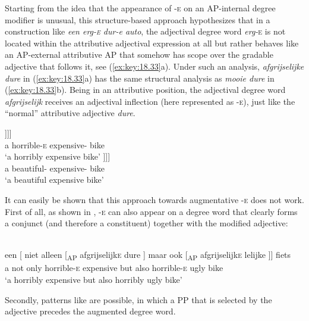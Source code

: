 \documentclass[output=paper]{langsci/langscibook}
\begin{document}
Starting from the idea that the appearance of \textsc{-e} on an AP-internal
degree modifier is unusual, this structure-based approach hypothesizes that in
a construction like \emph{een erg-\textsc{e} dur-e auto}, the adjectival degree
word \emph{erg-}\textsc{e} is not located within the attributive adjectival
expression at all but rather behaves like an AP-external attributive AP that
somehow has scope over the gradable adjective that follows it, see
(\ref{ex:key:18.33}a). Under such an analysis, \emph{afgrijselijke dure} in
(\ref{ex:key:18.33}a) has the same structural analysis as \emph{mooie dure} in
(\ref{ex:key:18.33}b). Being in an attributive position, the adjectival degree word
\emph{afgrijselijk} receives an adjectival inflection (here represented as
\textsc{-e}), just like the \enquote{normal} attributive adjective \emph{dure}.

\ea%
    \label{ex:key:18.33}
	\ea
	\gll  [\textsubscript{DP} een    [\textsubscript{NP}  afgrijselijk\textsc{-e}    [\textsubscript{NP}  dure              [\textsubscript{NP} fiets ]]]]\\
		{} a  {}                  horrible-\textsc{e}    {}        expensive-\Agr{}  {}    bike\\
	\glt \enquote*{a horribly expensive bike}
	\ex
	\gll  [\textsubscript{DP}  een    [\textsubscript{NP}  mooie        [\textsubscript{NP}  dure                [\textsubscript{NP}  fiets ]]]]\\
		{} a  {}     beautiful-\Agr{}  {}    expensive-\Agr{} {}   bike\\
	\glt \enquote*{a beautiful expensive bike}
	\z
\z

It can easily be shown that this approach towards augmentative \textsc{-e} does
not work. First of all, as shown in , \textsc{-e} can also
appear on a degree word that clearly forms a conjunct (and therefore a
constituent) together with the modified adjective:

\ea%
    \label{ex:key:18.34}\\
    \gll een [ niet alleen [\textsubscript{AP} afgrijselijk\textsc{e} dure ] maar ook [\textsubscript{AP} afgrijselijk\textsc{e} lelijke ]] fiets\\
    a {} not only {} horrible-\textsc{e} expensive {} but also {} horrible-\textsc{e} ugly {} bike\\
    \glt ‘a horribly expensive but also horribly ugly bike’
\z

Secondly, patterns like  are possible, in which a PP that is
selected by the adjective precedes the augmented degree word.
\end{document}
